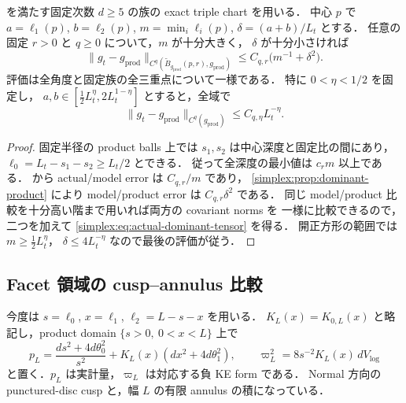 \begin{corollary}
\label{simplex:cor:actual-dominant-product}
 を満たす固定次数 $d\ge5$ の族の exact triple chart を用いる．
中心 $p$ で $a=\ell_1(p)$, $b=\ell_2(p)$,
$m=\min_i\ell_i(p)$, $\delta=(a+b)/L_t$ とする．
任意の固定 $r>0$ と $q\ge0$ について，$m$ が十分大きく，
$\delta$ が十分小さければ
\begin{equation}\label{simplex:eq:actual-dominant-tensor}
 \|g_t-g_{\mathrm{prod}}\|
 _{C^q(\widetilde B_{g_{\mathrm{prod}}}(p,r),g_{\mathrm{prod}})}
 \le C_{q,r}\bigl(m^{-1}+\delta^2\bigr).
\end{equation}
評価は全角度と固定族の全三重点について一様である．
特に $0<\eta<1/2$ を固定し，
$a,b\in[\tfrac12L_t^\eta,2L_t^{1-\eta}]$ とすると，全域で
\begin{equation}\label{simplex:eq:open-square-improved-rate}
 \|g_t-g_{\mathrm{prod}}\|_{C^q(g_{\mathrm{prod}})}
       \le C_{q,\eta}L_t^{-\eta}.
\end{equation}
\end{corollary}

\begin{proof}
固定半径の product balls 上では $s_1,s_2$ は中心深度と固定比の間にあり，
$\ell_0=L_t-s_1-s_2\ge L_t/2$ とできる．
従って全深度の最小値は $c_r m$ 以上である．
 から actual/model error は $C_{q,r}/m$ であり，
\cref{simplex:prop:dominant-product} により model/product error は
$C_{q,r}\delta^2$ である．
同じ model/product 比較を十分高い階まで用いれば両方の covariant norms を
一様に比較できるので，二つを加えて \eqref{simplex:eq:actual-dominant-tensor} を得る．
開正方形の範囲では $m\ge\tfrac12L_t^\eta$，
$\delta\le4L_t^{-\eta}$ なので最後の評価が従う．
\end{proof}

\subsection{Facet 領域の cusp--annulus 比較}

今度は $s=\ell_0$, $x=\ell_1$, $\ell_2=L-s-x$ を用いる．
$K_L(x)=K_{0,L}(x)$ と略記し，product domain
$\{s>0,\ 0<x<L\}$ 上で
\begin{equation}\label{simplex:eq:facet-product}
 p_L=\frac{ds^2+4d\theta_0^2}{s^2}
       +K_L(x)(dx^2+4d\theta_1^2),
 \qquad
 \varpi_L^2=8s^{-2}K_L(x)\,dV_{\log}
\end{equation}
と置く．$p_L$ は実計量，$\varpi_L$ は対応する負 KE form である．
Normal 方向の punctured-disc cusp と，幅 $L$ の有限 annulus の積になっている．

